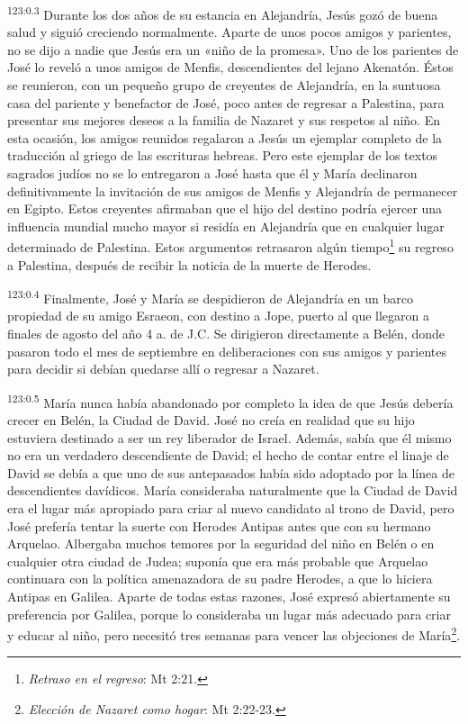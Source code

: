 \par 
\textsuperscript{123:0.3} Durante los dos años de su estancia en Alejandría, Jesús gozó de buena salud y siguió creciendo normalmente. Aparte de unos pocos amigos y parientes, no se dijo a nadie que Jesús era un «niño de la promesa». Uno de los parientes de José lo reveló a unos amigos de Menfis, descendientes del lejano Akenatón. Éstos se reunieron, con un pequeño grupo de creyentes de Alejandría, en la suntuosa casa del pariente y benefactor de José, poco antes de regresar a Palestina, para presentar sus mejores deseos a la familia de Nazaret y sus respetos al niño. En esta ocasión, los amigos reunidos regalaron a Jesús un ejemplar completo de la traducción al griego de las escrituras hebreas. Pero este ejemplar de los textos sagrados judíos no se lo entregaron a José hasta que él y María declinaron definitivamente la invitación de sus amigos de Menfis y Alejandría de permanecer en Egipto. Estos creyentes afirmaban que el hijo del destino podría ejercer una influencia mundial mucho mayor si residía en Alejandría que en cualquier lugar determinado de Palestina. Estos argumentos retrasaron algún tiempo\footnote{\textit{Retraso en el regreso}: Mt 2:21.} su regreso a Palestina, después de recibir la noticia de la muerte de Herodes.

\par 
\textsuperscript{123:0.4} Finalmente, José y María se despidieron de Alejandría en un barco propiedad de su amigo Esraeon, con destino a Jope, puerto al que llegaron a finales de agosto del año 4 a. de J.C. Se dirigieron directamente a Belén, donde pasaron todo el mes de septiembre en deliberaciones con sus amigos y parientes para decidir si debían quedarse allí o regresar a Nazaret.

\par 
\textsuperscript{123:0.5} María nunca había abandonado por completo la idea de que Jesús debería crecer en Belén, la Ciudad de David. José no creía en realidad que su hijo estuviera destinado a ser un rey liberador de Israel. Además, sabía que él mismo no era un verdadero descendiente de David; el hecho de contar entre el linaje de David se debía a que uno de sus antepasados había sido adoptado por la línea de descendientes davídicos. María consideraba naturalmente que la Ciudad de David era el lugar más apropiado para criar al nuevo candidato al trono de David, pero José prefería tentar la suerte con Herodes Antipas antes que con su hermano Arquelao. Albergaba muchos temores por la seguridad del niño en Belén o en cualquier otra ciudad de Judea; suponía que era más probable que Arquelao continuara con la política amenazadora de su padre Herodes, a que lo hiciera Antipas en Galilea. Aparte de todas estas razones, José expresó abiertamente su preferencia por Galilea, porque lo consideraba un lugar más adecuado para criar y educar al niño, pero necesitó tres semanas para vencer las objeciones de María\footnote{\textit{Elección de Nazaret como hogar}: Mt 2:22-23.}.

